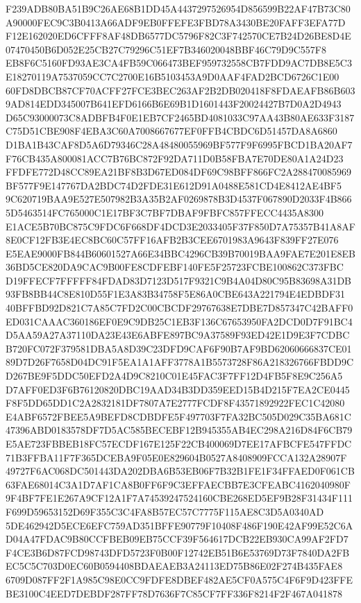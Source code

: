 \documentclass[UTF8,fontset=fandol,zihao=-4,a4paper]{ctexart}
\begin{document}
{{F239ADB80BA51B9C26AE68B1DD45A4437297526954D856599B22AF47B73C80A90000FEC9C3B0413A66ADF9EB0FFEFE3FBD78A3430BE20FAFF3EFA77D
F12E162020ED6CFFF8AF48DB6577DC5796F82C3F742570CE7B24D26BE8D4E07470450B6D052E25CB27C79296C51EF7B346020048BBF46C79D9C557F8
EB8F6C5160FD93AE3CA4FB59C066473BEF959732558CB7FDD9AC7DB8E5C3E18270119A7537059CC7C2700E16B5103453A9D0AAF4FAD2BCD6726C1E00
60FD8DBCB87CF70ACFF27FCE3BEC263AF2B2DB020418F8FDAEAFB86B6039AD814EDD345007B641EFD6166B6E69B1D1601443F20024427B7D0A2D4943
D65C93000073C8ADBFB4F0E1EB7CF2465BD4081033C97AA43B80AE633F3187C75D51CBE908F4EBA3C60A7008667677EF0FFB4CBDC6D51457DA8A6860
D1BA1B43CAF8D5A6D79346C28A48480055969BF577F9F6995FBCD1BA20AF7F76CB435A800081ACC7B76BC872F92DA711D0B58FBA7E70DE80A1A24D23
FFDFE772D48CC89EA21BF8B3D67ED084DF69C98BFF866FC2A288470085969BF577F9E147767DA2BDC74D2FDE31E612D91A0488E581CD4E8412AE4BF5
9C620719BAA9E527E507982B3A35B2AF0269878B3D4537F067890D2033F4B8665D5463514FC765000C1E17BF3C7BF7DBAF9FBFC857FFECC4435A8300
E1ACE5B70BC875C9FDC6F668DF4DCD3E2033405F37F850D7A75357B41A8AF8E0CF12FB3E4EC8BC60C57FF16AFB2B3CEE6701983A9643F839FF27E076
E5EAE9000FB844B60601527A66E34BBC4296CB39B70019BAA9FAE7E201E8EB36BD5CE820DA9CAC9B00FE8CDFEBF140FE5F25723FCBE100862C373FBC
D19FFECF7FFFFF84FDAD83D7123D517F9321C9B4A04D80C95B83698A31DB93FB8BB44C8E810D55F1E3A83B34758F5E86A0CBE643A221794E4EDBDF31
40BFFBD92D821C7A85C7FD2C00CBCDF29767638E7DBE7D857347C42BAFF0ED031CAAAC360186EF0E9C9DB25C1EB3F136C67653950FA2DCD0D7F91BC4
D5AA59A27A37110DA23E43E6ABFE897BC9A37589F93ED42E1D9E3F7CDBCB720FC072F379581DBA5A8D39C23DFD9CAF6F90B7AF9BD62060666837CE01
89D7D26F7658D04DC91F5EA1A1AFF3778A1B5573728F86A218326766FBDD9CD267BE9F5DDC50EFD2A4D9C8210C01E45FAC3F7FF12D4FB5F8E9C256A5
D7AFF0ED3F6B76120820DBC19AAD34B3DD359EED15B4D215F7EA2CE0445F8F5DD65DD1C2A2832181DF7807A7E2777FCDF8F43571892922FEC1C42080
E4ABF6572FBEE5A9BEFD8CDBDFE5F497703F7FA32BC505D029C35BA681C47396ABD0183578DF7D5AC585BECEBF12B945355AB4EC298A216D84F6CB79
E5AE723FBBEB18FC57ECDF167E125F22CB400069D7EE17AFBCFE547FFDC71B3FFBA11F7F365DCEBA9F05E0E829604B0527A8408909FCCA132A28907F
49727F6AC068DC501443DA202DBA6B53EB06F7B32B1FE1F34FFAED0F061CB63FAE68014C3A1D7AF1CA8B0FF6F9C3EFFAECBB7E3CFEABC4162040980F
9F4BF7FE1E267A9CF12A1F7A74539247524160CBE268ED5EF9B28F31434F111F699D59653152D69F355C3C4FA8B57EC57C7775F115AE8C3D5A0340AD
5DE462942D5ECE6EFC759AD351BFFE90779F10408F486F190E42AF99E52C6AD04A47FDAC9B80CCFBEB09EB75CCF39F564617DCB22EB930CA99AF2FD7
F4CE3B6D87FCD98743DFD5723F0B00F12742EB51B6E53769D73F7840DA2FBEC5C5C703D0EC60B0594408BDAEAEB3A24113ED75B86E02F274B435FAE8
6709D087FF2F1A985C98E0CC9FDFE8DBEF482AE5CF0A575C4F6F9D423FFEBE3100C4EED7DEBDF287FF78D7636F7C85CF7FF336F8214F2F467A041878
}}
\end{document}
